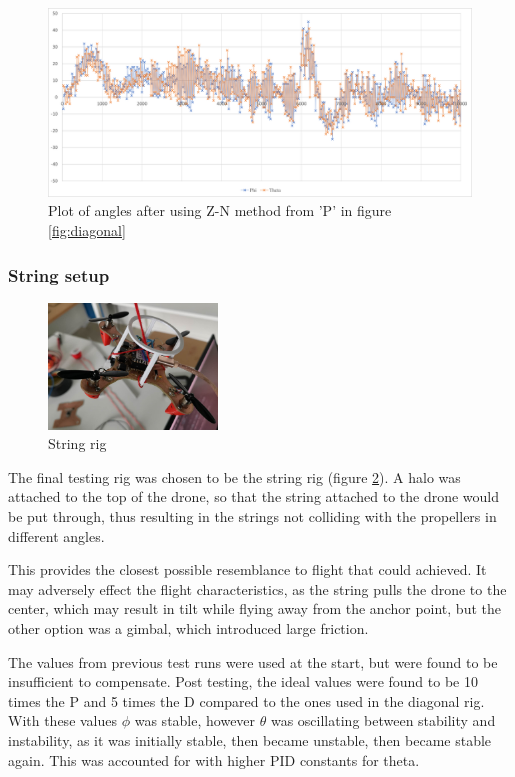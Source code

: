\newpage

\begin{figure}[h!]
    \centering
    \includegraphics[width=\textwidth]{pictures/graphs/ZN.png}
    \caption{Plot of angles after using Z-N method from 'P' in figure \ref{fig:diagonal}}
    \label{fig:ZN}
\end{figure}

\subsubsection{String setup}
\begin{figure}
    \centering
    \includegraphics[width=0.4\textwidth]{pictures/String_rig.jpg}
    \caption{String rig}
    \label{fig:string_rig}
\end{figure}
The final testing rig was chosen to be the string rig (figure \ref{fig:string_rig}). A halo was attached to the top of the drone, so that the string attached to the drone would be put through, thus resulting in the strings not colliding with the propellers in different angles.

This provides the closest possible resemblance to flight that could achieved. It may adversely effect the flight characteristics, as the string pulls the drone to the center, which may result in tilt while flying away from the anchor point, but the other option was a gimbal, which introduced large friction.

The values from previous test runs were used at the start, but were found to be insufficient to compensate. Post testing, the ideal values were found to be 10 times the P and 5 times the D compared to the ones used in the diagonal rig. With these values $\phi$ was stable, however $\theta$ was oscillating between stability and instability, as it was initially stable, then became unstable, then became stable again. This was accounted for with higher PID constants for theta.

